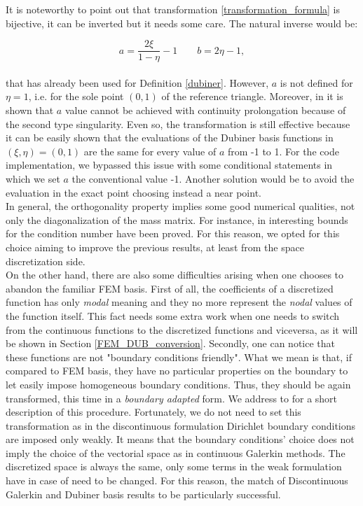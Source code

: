 \documentclass[a4paper,11pt]{article}
\begin{document}
    \noindent It is noteworthy to point out that transformation \ref{transformation_formula} is bijective, it can be inverted but it needs some care. The natural inverse would be:
    
    \begin{equation*}
    a = \frac{2\xi}{1-\eta}-1 \quad \quad b = 2\eta-1,
    \end{equation*}
    \vspace{2mm} \\
    \noindent that has already been used for Definition \ref{dubiner}. However, $a$ is not defined for $\eta=1$, i.e. for the sole point $(0,1)$ of the reference triangle. Moreover, in \cite{sherwin} it is shown that $a$ value cannot be achieved with continuity prolongation because of the second type singularity. Even so, the transformation is still effective because it can be easily shown that the evaluations of the Dubiner basis functions in $(\xi,\eta)=(0,1)$ are the same for every value of $a$ from -1 to 1. For the code implementation, we bypassed this issue with some conditional statements in which we set $a$ the conventional value -1. Another solution would be to avoid the evaluation in the exact point choosing instead a near point.\\
    
    \noindent In general, the orthogonality property implies some good numerical qualities, not only the diagonalization of the mass matrix. For instance, in \cite{antonietti} interesting bounds for the condition number have been proved. For this reason, we opted for this choice aiming to improve the previous results, at least from the space discretization side. \\
    
    \noindent On the other hand, there are also some difficulties arising when one chooses to abandon the familiar FEM basis. First of all, the coefficients of a discretized function has only \emph{modal} meaning and they no more represent the \emph{nodal} values of the function itself. This fact needs some extra work when one needs to switch from the continuous functions to the discretized functions and viceversa, as it will be shown in Section \ref{FEM_DUB_conversion}. Secondly, one can notice that these functions are not "boundary conditions friendly". What we mean is that, if compared to FEM basis, they have no particular properties on the boundary to let easily impose homogeneous boundary conditions. Thus, they should be again transformed, this time in a \emph{boundary adapted} form. We address to \cite{napde} for a short description of this procedure. Fortunately, we do not need to set this transformation as in the discontinuous formulation Dirichlet boundary conditions are imposed only weakly. It means that the boundary conditions' choice does not imply the choice of the vectorial space as in continuous Galerkin methods. The discretized space is always the same, only some terms in the weak formulation have in case of need to be changed. For this reason, the match of Discontinuous Galerkin and Dubiner basis results to be particularly successful. \\
    
\end{document}
